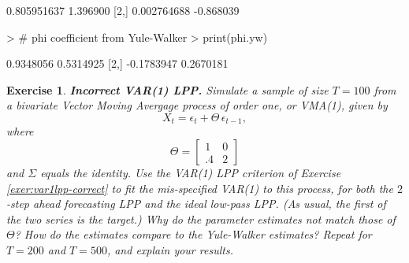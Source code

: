 \documentclass[a4paper]{book}
\newtheorem{Exercise}{Exercise}
\begin{document}
\begin{Schunk}
\begin{Soutput}
            [,1]      [,2]
[1,] 0.805951637  1.396900
[2,] 0.002764688 -0.868039
\end{Soutput}
\begin{Sinput}
> # phi coefficient from Yule-Walker
> print(phi.yw)
\end{Sinput}
\begin{Soutput}
           [,1]      [,2]
[1,]  0.9348056 0.5314925
[2,] -0.1783947 0.2670181
\end{Soutput}
\end{Schunk}

\begin{Exercise} {\bf Incorrect VAR(1) LPP.} \rm
\label{exer:var1lpp-incorrect}
 Simulate a sample of size $T=100$ from
 a bivariate Vector Moving Avergage process of order one, or VMA(1), given by
\[
  X_t = \epsilon_t + \Theta \, \epsilon_{t-1},
\]
  where
\[
 \Theta = \left[ \begin{array}{ll} 1 & 0 \\ .4 & 2 \end{array} \right]
\]
  and $\Sigma$ equals the identity.  Use the VAR(1) LPP criterion of 
 Exercise \ref{exer:var1lpp-correct} to 
 fit the mis-specified VAR(1) to this process, for both the $2$-step ahead forecasting
 LPP and the ideal low-pass LPP. 
(As usual, the first of the two series is the target.)
 Why do the parameter estimates not match those
 of $\Theta$?   How do the estimates compare to the Yule-Walker estimates?
 Repeat for $T=200$ and $T=500$, and explain your results.
\end{Exercise}
\end{document}
